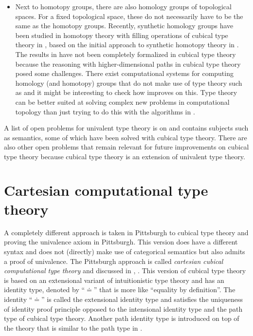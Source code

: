 \documentclass[12pt,a4paper,twoside,xetex]{book} %
\newcommand{\keyword}[1]{\emph{#1}\index{#1}}
\begin{document}
\begin{itemize}
\item Next to homotopy groups, there are also homology groups of topological 
spaces. For a fixed topological space, these do not necessarily have to be the 
same as the homotopy groups. Recently, synthetic homology groups have  been 
studied in homotopy theory with filling operations of cubical type theory in 
\cite{Graham2018}, based on the initial approach to synthetic homotopy theory in 
\cite{Licata2015}. The results in \cite{Graham2018} have not been completely 
formalized in cubical type theory because the reasoning with higher-dimensional 
paths in cubical type theory posed some challenges. There exist computational 
systems for computing homology  (and homotopy) groups that do not make use of 
type theory such as \cite{GaSeSi99} and it might be interesting to check how 
\cite{Graham2018} improves on this. Type theory can be better suited at solving 
complex new problems in computational topology than just trying to do this with 
the algorithms in \cite{GaSeSi99}.
\end{itemize}

A list of open problems for univalent type theory is on \cite{Awodey2019} and 
contains subjects such as semantics, some of which have been solved with cubical 
type theory. There are also other open problems that remain relevant for future 
improvements on cubical type theory because cubical type theory is an extension 
of univalent type theory.





\section{Cartesian computational type theory}\label{comptt}

A completely different approach is taken in Pittsburgh  to cubical type theory and proving the univalence axiom in Pittsburgh. This version does have a different syntax and does not (directly) make use of categorical semantics but also admits a proof of univalence. The Pittsburgh approach is called \keyword{cartesian cubical computational type theory} and discussed in  \cite{Angiuli2017}, \cite{Angiuli2018}. This version of 
cubical type theory is based on an extensional variant of intuitionistic type 
theory and has an identity type, denoted by ``$\doteq$'' that is more 
like ``equality by definition''. The identity ``$\doteq$'' is called the extensional identity type and satisfies the uniqueness of identity proof principle opposed to the intensional identity type  and the path type of cubical type theory. Another path identity 
type is introduced on top of the theory that is similar to the path type in . 
\end{document}
